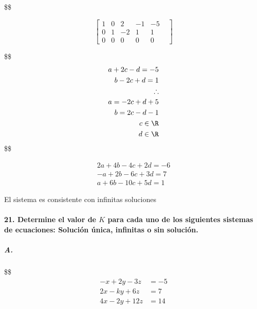 \documentclass[
]{article}
\begin{document}

\$\$

\[
\left[
    \begin{array}{rrrr|r}
        1&0&2&-1&-5\\
        0&1&-2&1&1\\
        0&0&0&0&0&
    \end{array}
\right]
\]

\$\$ \begin{align*}
    a+2c-d = -5\\
    b-2c+d=1\\

    \therefore \\
    a = -2c+d+5\\
    b = 2c-d-1\\
    c \in \R\\
    d \in \R
\end{align*} \$\$

\[
\begin{align*}
    2a+4b-4c+2d=-6\\-a+2b-6c+3d=7\\a+6b-10c+5d=1
\end{align*}
\]

El sistema es consistente con infinitas soluciones

\hypertarget{determine-el-valor-de-k-para-cada-uno-de-los-siguientes-sistemas-de-ecuaciones-soluciuxf3n-uxfanica-infinitas-o-sin-soluciuxf3n.}{%
\paragraph{\texorpdfstring{21. Determine el valor de \(K\) para cada uno
de los siguientes sistemas de ecuaciones: Solución única, infinitas o
sin
solución.}{21. Determine el valor de K para cada uno de los siguientes sistemas de ecuaciones: Solución única, infinitas o sin solución.}}\label{determine-el-valor-de-k-para-cada-uno-de-los-siguientes-sistemas-de-ecuaciones-soluciuxf3n-uxfanica-infinitas-o-sin-soluciuxf3n.}}

\hypertarget{a.-1}{%
\subparagraph{A.}\label{a.-1}}

\$\$ \begin{align*}
    -x+2y-3z&=-5\\
    2x-ky+6z&=7\\
    4x-2y+12z&=14
\end{align*}
\end{document}
